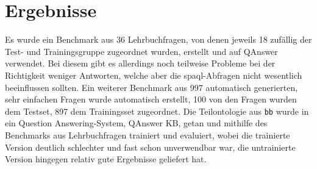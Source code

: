 \chapter{Ergebnisse}\label{ch:results}
Es wurde ein Benchmark aus 36 Lehrbuchfragen, von denen jeweils 18 zufällig der Test- und Trainingsgruppe zugeordnet wurden, erstellt und auf QAnswer verwendet.
Bei diesem gibt es allerdings noch teilweise Probleme bei der Richtigkeit weniger Antworten, welche aber die \ac{spaql}-Abfragen nicht wesentlich beeinflussen sollten.
Ein weiterer Benchmark aus 997 automatisch generierten, sehr einfachen Fragen wurde automatisch erstellt, 100 von den Fragen wurden dem Testset, 897 dem Trainingsset zugeordnet.
Die Teilontologie aus \texttt{bb} wurde in ein Question Answering-System, QAnswer KB, getan und mithilfe des Benchmarks aus Lehrbuchfragen trainiert und evaluiert,
wobei die trainierte Version deutlich schlechter und fast schon unverwendbar war, die untrainierte Version hingegen relativ gute Ergebnisse geliefert hat.
